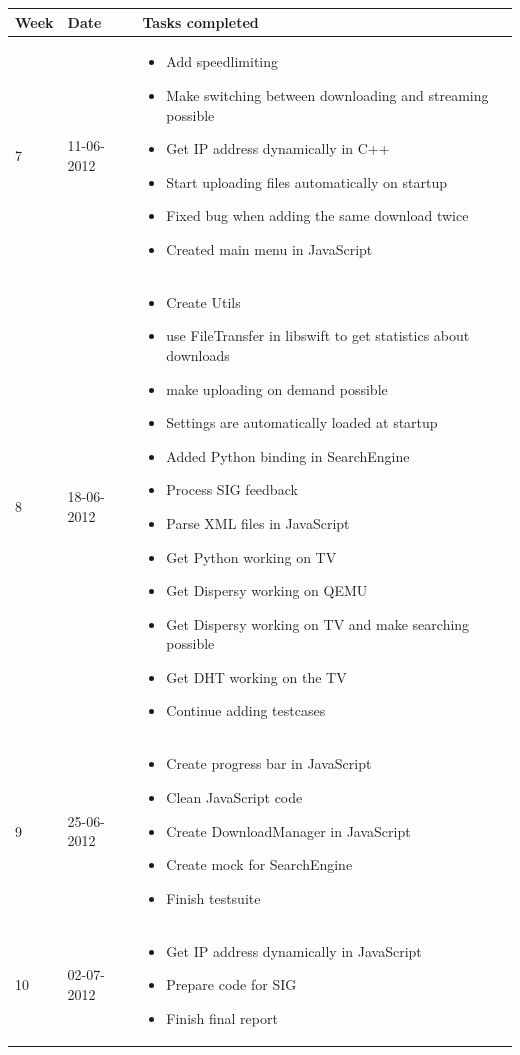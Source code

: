 \begin{table}
\centering
	\begin{tabular}{| l | l | p{8 cm} |}
		\hline
		Week & Date & Tasks completed \\
		\hline
		\hline
		7 & 11-06-2012 &		\begin{itemize}
								\item Add speedlimiting
								\item Make switching between downloading and streaming possible
								\item Get IP address dynamically in C++
								\item Start uploading files automatically on startup
								\item Fixed bug when adding the same download twice
								\item Created main menu in JavaScript
							\end{itemize} \\
		\hline
		8 & 18-06-2012 &		\begin{itemize}
								\item Create Utils
								\item use FileTransfer in libswift to get statistics about downloads
								\item make uploading on demand possible
								\item Settings are automatically loaded at startup
								\item Added Python binding in SearchEngine
								\item Process SIG feedback
								\item Parse XML files in JavaScript
								\item Get Python working on TV
								\item Get Dispersy working on QEMU
								\item Get Dispersy working on TV and make searching possible
								\item Get DHT working on the TV
								\item Continue adding testcases
							\end{itemize} \\
		\hline
		9 & 25-06-2012 &		\begin{itemize}
								\item Create progress bar in JavaScript
								\item Clean JavaScript code
								\item Create DownloadManager in JavaScript
								\item Create mock for SearchEngine
								\item Finish testsuite
							\end{itemize} \\
		\hline
		10 & 02-07-2012 &	\begin{itemize}
								\item Get IP address dynamically in JavaScript
								\item Prepare code for SIG
								\item Finish final report
							\end{itemize} \\
		\hline


\end{tabular}
\end{table}
